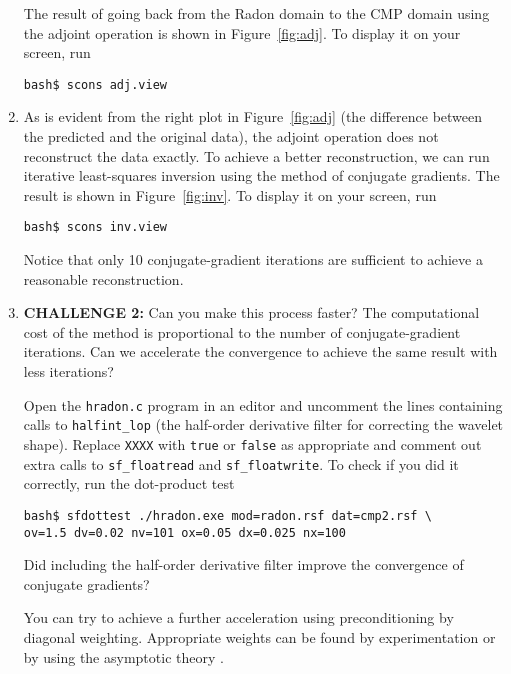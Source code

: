 \begin{enumerate}
The result of going back from the Radon domain to the CMP domain using the adjoint operation is shown in Figure~\ref{fig:adj}. To display it on your screen, run
\begin{verbatim}
bash$ scons adj.view
\end{verbatim}


\item As is evident from the right plot in Figure~\ref{fig:adj} (the difference between the predicted and the original data), the adjoint operation does not reconstruct the data exactly. To achieve a better reconstruction, we can run iterative least-squares inversion using the method of conjugate gradients. The result is shown in Figure~\ref{fig:inv}. To display it on your screen, run
\begin{verbatim}
bash$ scons inv.view
\end{verbatim}

Notice that only 10 conjugate-gradient iterations are sufficient to achieve a reasonable reconstruction.

\item \textbf{CHALLENGE 2:} Can you make this process faster? The computational cost of the method is proportional to the number of conjugate-gradient iterations. Can we accelerate the convergence to achieve the same result with less iterations?

Open the \texttt{hradon.c} program in an editor and uncomment the lines containing calls to \texttt{halfint\_lop} (the half-order derivative filter for correcting the wavelet shape). Replace \texttt{XXXX} with \texttt{true} or \texttt{false} as appropriate and comment out extra calls to \texttt{sf\_floatread} and \texttt{sf\_floatwrite}. To check if you did it correctly, run the dot-product test
\begin{verbatim}
bash$ sfdottest ./hradon.exe mod=radon.rsf dat=cmp2.rsf \
ov=1.5 dv=0.02 nv=101 ox=0.05 dx=0.025 nx=100
\end{verbatim}
Did including the half-order derivative filter improve the convergence of conjugate gradients? 

You can try to achieve  a further acceleration using preconditioning by diagonal weighting. Appropriate weights can be found by experimentation or by using the asymptotic theory \cite[]{GEO68-03-10321042}. 


\end{enumerate}
